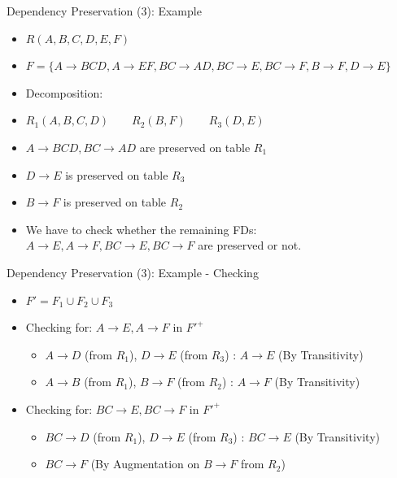 \documentclass[aspectratio=169, xcolor=dvipsnames]{beamer}
\begin{document}
\begin{frame}{Dependency Preservation (3): Example}
    \begin{itemize}[<+->]
        \item $R(A, B, C, D, E, F)$
        \item $F = \{A \rightarrow BCD, A \rightarrow EF, BC \rightarrow AD, BC \rightarrow E, BC \rightarrow F, B \rightarrow F, D \rightarrow E\}$
        \item Decomposition:
        \item $R_1(A, B, C, D) \qquad R_2(B, F) \qquad R_3(D, E)$
        \item $A \rightarrow BCD, BC \rightarrow AD$ are preserved on table $R_1$
        \item $D \rightarrow E$ is preserved on table $R_3$
        \item $B \rightarrow F$ is preserved on table $R_2$
        \item We have to check whether the remaining FDs: $A \rightarrow E, A \rightarrow F, BC \rightarrow E, BC \rightarrow F$ are preserved or not.
    \end{itemize}
\end{frame}

\begin{frame}{Dependency Preservation (3): Example - Checking}
    \begin{itemize}[<+->]
        \item $F' = F_1 \cup F_2 \cup F_3$
        \item Checking for: $A \rightarrow E, A \rightarrow F$ in $F'^+$
        \begin{itemize}
            \item[$\triangleright$] $A \rightarrow D$ (from $R_1$), $D \rightarrow E$ (from $R_3$) : $A \rightarrow E$ (By Transitivity)
            \item[$\triangleright$] $A \rightarrow B$ (from $R_1$), $B \rightarrow F$ (from $R_2$) : $A \rightarrow F$ (By Transitivity)
        \end{itemize}
        \item Checking for: $BC \rightarrow E, BC \rightarrow F$ in $F'^+$
        \begin{itemize}
            \item[$\triangleright$] $BC \rightarrow D$ (from $R_1$), $D \rightarrow E$ (from $R_3$) : $BC \rightarrow E$ (By Transitivity)
            \item[$\triangleright$] $BC \rightarrow F$ (By Augmentation on $B \rightarrow F$ from $R_2$)
        \end{itemize}
    \end{itemize}
    \vspace{1em}
\end{frame}
\end{document}
